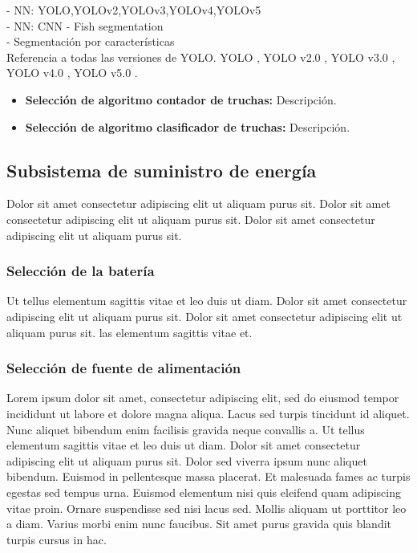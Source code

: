 - NN: YOLO,YOLOv2,YOLOv3,YOLOv4,YOLOv5 \\
- NN: CNN - Fish segmentation \\
- Segmentación por características \\

Referencia a todas las versiones de YOLO. YOLO \cite{Redmon2016}, YOLO v2.0 \cite{Redmon2017}, YOLO v3.0 \cite{Redmon2018}, YOLO v4.0 \cite{Solawetz2020}, YOLO v5.0 \cite{bochkovskiy2020yolov4}.


\begin{itemize}
	
	\item \textbf{Selección de algoritmo contador de truchas:} Descripción.
	
	\item \textbf{Selección de algoritmo clasificador de truchas:} Descripción.
	
\end{itemize}

\subsection{Subsistema de suministro de energía}

 Dolor sit amet consectetur adipiscing elit ut aliquam purus sit. Dolor sit amet consectetur adipiscing elit ut aliquam purus sit. Dolor sit amet consectetur adipiscing elit ut aliquam purus sit.

\subsubsection{Selección de la batería} 

Ut tellus elementum sagittis vitae et leo duis ut diam. Dolor sit amet consectetur adipiscing elit ut aliquam purus sit.  Dolor sit amet consectetur adipiscing elit ut aliquam purus sit. las elementum sagittis vitae et.


\subsubsection{Selección de fuente de alimentación} 

Lorem ipsum dolor sit amet, consectetur adipiscing elit, sed do eiusmod tempor incididunt ut labore et dolore magna aliqua. Lacus sed turpis tincidunt id aliquet. Nunc aliquet bibendum enim facilisis gravida neque convallis a. Ut tellus elementum sagittis vitae et leo duis ut diam. Dolor sit amet consectetur adipiscing elit ut aliquam purus sit. Dolor sed viverra ipsum nunc aliquet bibendum. Euismod in pellentesque massa placerat. Et malesuada fames ac turpis egestas sed tempus urna. Euismod elementum nisi quis eleifend quam adipiscing vitae proin. Ornare suspendisse sed nisi lacus sed. Mollis aliquam ut porttitor leo a diam. Varius morbi enim nunc faucibus. Sit amet purus gravida quis blandit turpis cursus in hac.

